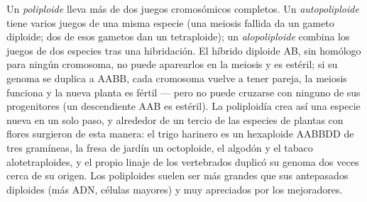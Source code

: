 \begin{definition}[Poliploidía]\label{def:b2:genome-diversification:polyploidy}
Un \emph{poliploide} lleva más de dos juegos cromosómicos completos. Un
\emph{autopoliploide} tiene varios juegos de una misma especie (una
meiosis fallida da un gameto diploide; dos de esos gametos dan un
tetraploide); un \emph{alopoliploide} combina los juegos de dos especies
tras una hibridación. El híbrido diploide AB, sin homólogo para ningún
cromosoma, no puede aparearlos en la meiosis y es estéril; si su genoma
se duplica a AABB, cada cromosoma vuelve a tener pareja, la meiosis
funciona y la nueva planta es fértil --- pero no puede cruzarse con
ninguno de sus progenitores (un descendiente AAB es estéril). La
poliploidía crea así una especie nueva en un solo paso, y alrededor de un
tercio de las especies de plantas con flores surgieron de esta manera: el
trigo harinero es un hexaploide AABBDD de tres gramíneas, la fresa de
jardín un octoploide, el algodón y el tabaco alotetraploides, y el propio
linaje de los vertebrados duplicó su genoma dos veces cerca de su origen.
Los poliploides suelen ser más grandes que sus antepasados diploides (más
ADN, células mayores) y muy apreciados por los mejoradores.
\end{definition}

